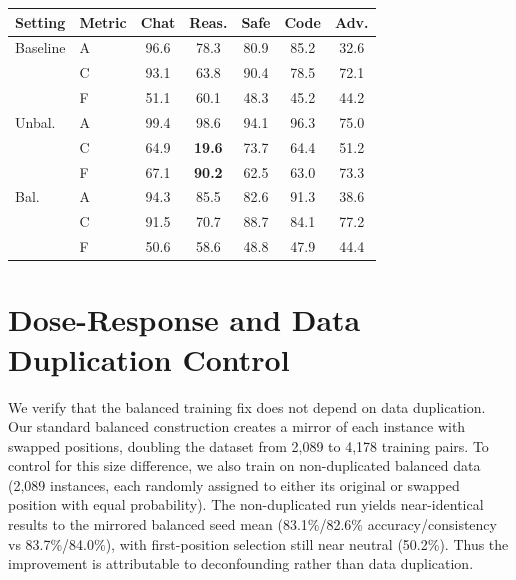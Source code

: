 \documentclass[letterpaper]{article}
\newcommand{\multirow}[3]{#3}
\begin{document}
\begin{center}
\begin{minipage}{\columnwidth}
\centering
\footnotesize
\setlength{\tabcolsep}{3pt}
\begin{tabular}{llccccc}
\toprule
\textbf{Setting} & \textbf{Metric} & \textbf{Chat} & \textbf{Reas.} & \textbf{Safe} & \textbf{Code} & \textbf{Adv.} \\
\midrule
\multirow{3}{*}{Baseline} & A & 96.6 & 78.3 & 80.9 & 85.2 & 32.6 \\
 & C & 93.1 & 63.8 & 90.4 & 78.5 & 72.1 \\
 & F & 51.1 & 60.1 & 48.3 & 45.2 & 44.2 \\
\midrule
\multirow{3}{*}{Unbal.} & A & 99.4 & 98.6 & 94.1 & 96.3 & 75.0 \\
 & C & 64.9 & \textbf{19.6} & 73.7 & 64.4 & 51.2 \\
 & F & 67.1 & \textbf{90.2} & 62.5 & 63.0 & 73.3 \\
\midrule
\multirow{3}{*}{Bal.} & A & 94.3 & 85.5 & 82.6 & 91.3 & 38.6 \\
 & C & 91.5 & 70.7 & 88.7 & 84.1 & 77.2 \\
 & F & 50.6 & 58.6 & 48.8 & 47.9 & 44.4 \\
\bottomrule
\end{tabular}
\captionsetup{hypcap=false}
\label{tab:domain}
\end{minipage}
\end{center}

\section{Dose-Response and Data Duplication Control}
\label{app:dose}

We verify that the balanced training fix does not depend on data duplication. Our standard balanced construction creates a mirror of each instance with swapped positions, doubling the dataset from 2,089 to 4,178 training pairs. To control for this size difference, we also train on non-duplicated balanced data (2,089 instances, each randomly assigned to either its original or swapped position with equal probability). The non-duplicated run yields near-identical results to the mirrored balanced seed mean (83.1\%/82.6\% accuracy/consistency vs 83.7\%/84.0\%), with first-position selection still near neutral (50.2\%). Thus the improvement is attributable to deconfounding rather than data duplication.
\end{document}
